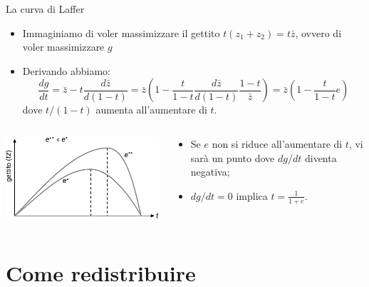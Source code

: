 \documentclass[aspectratio=64,12pt]{beamer}
\begin{document}
\begin{frame}{La curva di Laffer}
\begin{itemize}
\item Immaginiamo di voler massimizzare il gettito $t(z_1+z_2)=t\bar{z}$, ovvero di voler
massimizzare $g$
\item Derivando abbiamo:
\begin{equation*}
  \frac{dg}{dt}=\bar{z}-t\frac{d\bar{z}}{d(1-t)} = \bar{z}\left(1-\frac{t}{1-t}\frac{d\bar{z}}{d(1-t)}\frac{1-t}{\bar{z}}\right)=
  \bar{z}\left(1-\frac{t}{1-t}e\right)
\end{equation*}
dove $t/(1-t)$ aumenta all'aumentare di $t$.
\end{itemize}

\begin{columns}
\begin{column}{.45\columnwidth}
\begin{center}
\includegraphics[width=\textwidth]{./figure/laffer-1.pdf}
\end{center}
\end{column}

\begin{column}{.45\columnwidth}
\begin{itemize}
\item Se $e$ non si riduce all'aumentare di $t$, vi sarà un punto dove $dg/dt$ diventa negativa;
\item $dg/dt=0$ implica $t=\frac{1}{1+e}$.
\end{itemize}
\end{column}
\end{columns}
\end{frame}

\section{Come redistribuire}
\end{document}
